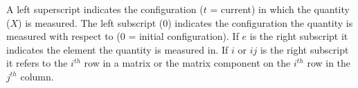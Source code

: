 A left superscript indicates the configuration ($t$ = current) in
which the quantity ($X$) is measured. The left subscript ($0$) indicates the
configuration the quantity is measured with respect to ($0$ =
initial configuration). If $e$ is the right subscript it indicates the
element the quantity is measured in. If $i$ or $ij$ is the right
subscript it refers to the $i^{th}$ row in a matrix or the matrix
component on the $i^{th}$ row in the $j^{th}$ column. 





